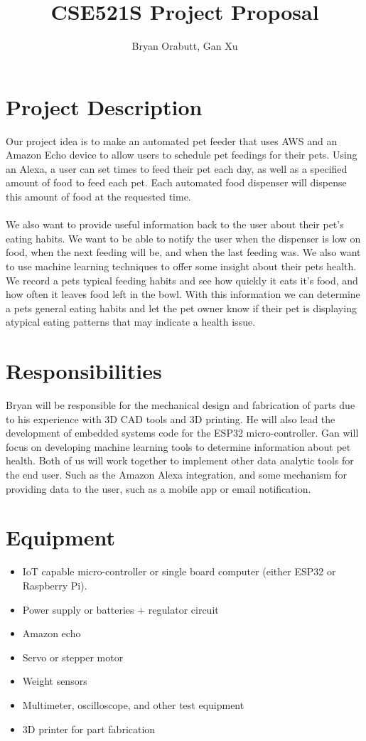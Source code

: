 \documentclass{article}
\title{CSE521S Project Proposal}
\author{Bryan Orabutt, Gan Xu}
\begin{document}
\maketitle 
\newpage
\section*{Project Description}

Our project idea is to make an automated pet feeder that uses AWS and an Amazon Echo device to allow users to schedule pet feedings for their pets. Using an Alexa, a user can set times to feed their pet each day, as well as a specified amount of food to feed each pet. Each automated food dispenser will dispense this amount of food at the requested time.\\\\\noindent
We also want to provide useful information back to the user about their pet's eating habits. We want to be able to notify the user when the dispenser is low on food, when the next feeding will be, and when the last feeding was. We also want to use machine learning techniques to offer some insight about their pets health. We record a pets typical feeding habits and see how quickly it eats it's food, and how often it leaves food left in the bowl. With this information we can determine a pets general eating habits and let the pet owner know if their pet is displaying atypical eating patterns that may indicate a health issue.

\section*{Responsibilities}
Bryan will be responsible for the mechanical design and fabrication of parts due to his experience with 3D CAD tools and 3D printing. He will also lead the development of embedded systems code for the ESP32 micro-controller.  Gan will focus on developing machine learning tools to determine information about pet health. Both of us will work together to implement other data analytic tools for the end user. Such as the Amazon Alexa integration, and some mechanism for providing data to the user, such as a mobile app or email notification.

\section*{Equipment}
\begin{itemize}
\item IoT capable micro-controller or single board computer (either ESP32 or Raspberry Pi).
\item Power supply or batteries + regulator circuit
\item Amazon echo
\item Servo or stepper motor
\item Weight sensors
\item Multimeter, oscilloscope, and other test equipment
\item 3D printer for part fabrication
\end{itemize}
\end{document}
